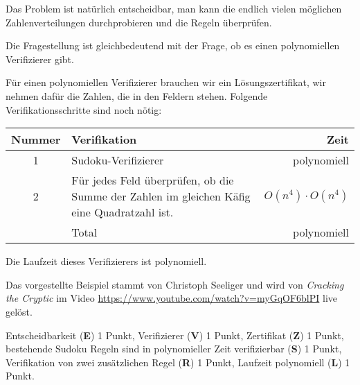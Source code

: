 \begin{loesung}
Das Problem ist natürlich entscheidbar, man kann die endlich vielen
möglichen Zahlenverteilungen durchprobieren und die Regeln überprüfen.

Die Fragestellung ist gleichbedeutend mit der Frage, ob es einen
polynomiellen Verifizierer gibt.

Für einen polynomiellen Verifizierer brauchen wir ein Lösungszertifikat,
wir nehmen dafür die Zahlen, die in den Feldern stehen.
Folgende Verifikationsschritte sind noch nötig:
\begin{center}
\begin{tabular}{c|p{8cm}|r}
Nummer&Verifikation&Zeit\\
\hline
1&Sudoku-Verifizierer&polynomiell\\
2&Für jedes Feld überprüfen, ob die Summe der Zahlen im gleichen Käfig
eine Quadratzahl ist.
&$O(n^4)\cdot O(n^4)$\\
\hline
&Total&polynomiell
\end{tabular}
\end{center}
Die Laufzeit dieses Verifizierers ist polynomiell.
\end{loesung}

\begin{diskussion}
Das vorgestellte Beispiel stammt von Christoph Seeliger und wird von
{\em Cracking the Cryptic} im Video
\url{https://www.youtube.com/watch?v=myGqOF6blPI}
live gelöst.
\end{diskussion}

\begin{bewertung}
Entscheidbarkeit ({\bf E}) 1 Punkt,
Verifizierer ({\bf V}) 1 Punkt,
Zertifikat ({\bf Z}) 1 Punkt,
bestehende Sudoku Regeln sind in polynomieller Zeit verifizierbar
({\bf S}) 1 Punkt,
Verifikation von zwei zusätzlichen Regel ({\bf R}) 1 Punkt,
Laufzeit polynomiell ({\bf L}) 1 Punkt.
\end{bewertung}

